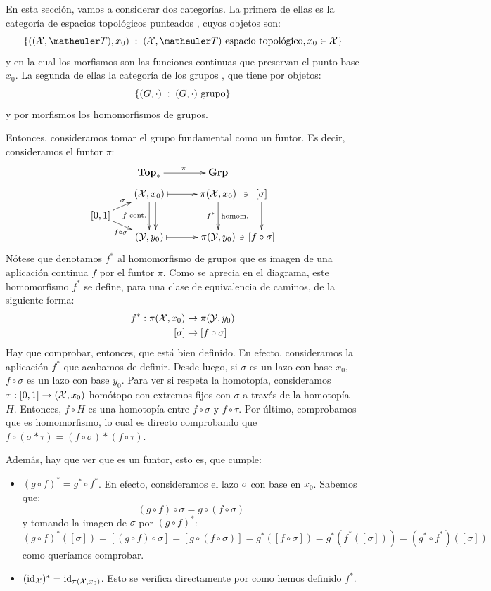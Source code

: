 \begin{const}
	En esta sección, vamos a considerar dos categorías. La primera de ellas es la categoría de espacios topológicos punteados \Topp, cuyos objetos son: 
	\[\{((\X,\T),x_0)\midc (\X,\T)\text{ espacio topológico}, x_0\in\X\}\]
	y en la cual los morfismos son las funciones continuas que preservan el punto base $x_0$. La segunda de ellas la categoría de los grupos \Grp, que tiene por objetos:
	\[\{(G,\cdot)\;:\; (G,\cdot) \text{ grupo}\}\]
	y por morfismos los homomorfismos de grupos.
	
	Entonces, consideramos tomar el grupo fundamental como un funtor. Es decir, consideramos el funtor $\pi$:
	\[\xymatrix @R=0.5pc @C=0.5pc {
		& & \Topp \ar[rrr]^\pi & & & \Grp & \\
		& & (\X,x_0) \ar@{|->}[rrr] \ar[dd]_{f \text{ cont.}} \ar@<1.5ex>@{|->}[dd] & & & \pi(\X,x_0) \ar[dd]_{f^\ast}^{\text{homom.}} \ar@{}[r]|-\ni & [\sigma] \ar@{|->}[dd] \\
		[0,1] \ar[urr]^\sigma \ar[drr]_{f\circ\sigma} & & & & & & \\
		& & (\Y,y_0) \ar@{|->}[rrr] & & & \pi(\Y,y_0) \ar@{}[r]|-\ni & [f\circ\sigma] \\
	}\]
	Nótese que denotamos $f^\ast$ al homomorfismo de grupos que es imagen de una aplicación continua $f$ por el funtor $\pi$.
	Como se aprecia en el diagrama, este homomorfismo $f^\ast$ se define, para una clase de equivalencia de caminos, de la siguiente forma:
	\[\begin{split}
	f^\ast:\pi(\mathcal{X}, x_0) &\to \pi(\mathcal{Y}, y_0) \\
	[\sigma] &\mapsto [f\circ\sigma]
	\end{split}\]
	Hay que comprobar, entonces, que está bien definido. En efecto, consideramos la aplicación $f^\ast$ que acabamos de definir. Desde luego, si $\sigma$ es un lazo con base $x_0$, $f\circ\sigma$ es un lazo con base $y_0$. Para ver si respeta la homotopía, consideramos $\tau:[0,1]\to (\mathcal{X},x_0)$ homótopo con extremos fijos con $\sigma$ a través de la homotopía $H$. Entonces, $f\circ H$ es una homotopía entre $f\circ\sigma$ y $f\circ\tau$. Por último, comprobamos que es homomorfismo, lo cual es directo comprobando que $f\circ(\sigma\ast\tau)=(f\circ\sigma)\ast (f\circ\tau)$.
	
	Además, hay que ver que es un funtor, esto es, que cumple:
	\begin{itemize}
		\item $(g\circ f)^\ast = g^\ast\circ f^\ast$. En efecto, consideramos el lazo $\sigma$ con base en $x_0$. Sabemos que:
		\[(g\circ f)\circ\sigma=g\circ(f\circ\sigma)\]
		y tomando la imagen de $\sigma$ por $(g\circ f)^\ast$:
			\[(g\circ f)^\ast([\sigma])=[(g\circ f)\circ\sigma]=[g\circ(f\circ\sigma)]=g^\ast([f\circ\sigma])=g^\ast(f^\ast([\sigma]))=(g^\ast\circ f^\ast)([\sigma])\]
		como queríamos comprobar.
		
		\item $(\operatorname{\mathrm{id}}_{\mathcal{X}})^\ast = \operatorname{\mathrm{id}}_{\pi(\mathcal{X}, x_0)}$. Esto se verifica directamente por como hemos definido $f^\ast$.
	\end{itemize}
\end{const}

